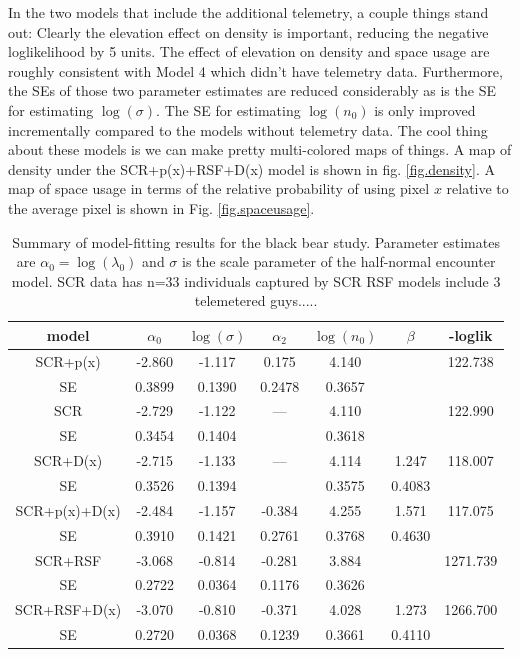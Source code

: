\documentclass[12pt]{article}
\begin{document}
In the two models that include the additional telemetry, a couple
things stand out: Clearly the elevation effect on density is
important, reducing the negative loglikelihood by 5 units. The effect
of elevation on density and space usage are roughly consistent with
Model 4 which didn't have telemetry data. Furthermore, the SEs of
those two parameter estimates are reduced considerably as is the SE
for estimating $\log(\sigma)$.  The SE for estimating $\log(n_{0})$ is
only improved incrementally compared to the models without telemetry
data.
The cool thing about these models is we can make pretty
multi-colored maps of things.  A map of density under the SCR+p(x)+RSF+D(x)
model is shown in fig. \ref{fig.density}.  A map of space usage in
terms of the relative probability of using pixel $x$ relative to the
average pixel is shown in Fig. \ref{fig.spaceusage}.


\begin{table}
\centering
\caption{
Summary of model-fitting results for the black bear study. Parameter
estimates are $\alpha_{0} = \log(\lambda_{0})$ and $\sigma$ is the
scale parameter of the half-normal encounter model.
SCR data has n=33 individuals captured by SCR
RSF models include
3 telemetered guys.....
}
\begin{tabular}{c|cccccc}
\hline \hline
model & $\alpha_0$ & $\log(\sigma)$ & $\alpha_{2}$ & $\log(n_{0})$ &
$\beta$ & -loglik \\ \hline
SCR+p(x)     & -2.860  & -1.117  &  0.175 &  4.140   &        &122.738  \\
   SE        &  0.3899 &  0.1390 &  0.2478&  0.3657  &        & \\
 SCR         & -2.729  &  -1.122 &  ---&  4.110   &        &              122.990   \\
   SE        &  0.3454 &   0.1404&        &  0.3618  &        &       \\
SCR+D(x)     & -2.715  & -1.133  &  ---  &  4.114   & 1.247  &   118.007  \\
   SE        &  0.3526 & 0.1394  &        &  0.3575  & 0.4083 &       \\
SCR+p(x)+D(x)& -2.484  & -1.157  &-0.384  &  4.255   & 1.571  &      117.075 \\
   SE        &  0.3910 &  0.1421 & 0.2761 &  0.3768  & 0.4630 & \\
SCR+RSF    &   -3.068  & -0.814  &-0.281  &  3.884   &        &   1271.739 \\
   SE      &    0.2722 &  0.0364 & 0.1176 &  0.3626  &        & \\
SCR+RSF+D(x)&  -3.070  &-0.810   &-0.371  &  4.028   & 1.273  &   1266.700 \\
   SE       &   0.2720 & 0.0368  & 0.1239 &  0.3661  & 0.4110 &    \\
\hline
\end{tabular}
\label{tab.nyresults}
\end{table}
\end{document}
